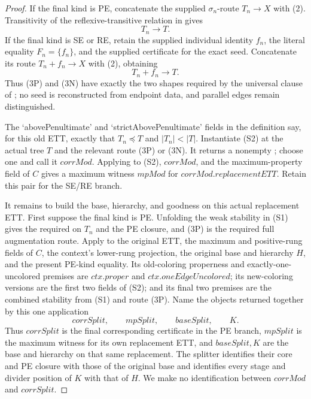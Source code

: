 \begin{proof}
If the final kind is PE, concatenate the supplied
\(\sigma_n\)-route \(T_n\longrightarrow X\) with (2).  Transitivity of the
reflexive-transitive relation in
 gives
\[
                         T_n\longrightarrow T.               \tag{3P}
\]
If the final kind is SE or RE, retain the supplied individual identity
\(f_n\), the literal equality \(F_n=\{f_n\}\), and the supplied
 certificate for the exact seed.  Concatenate
its route \(T_n+f_n\longrightarrow X\) with (2), obtaining
\[
                         T_n+f_n\longrightarrow T.           \tag{3N}
\]
Thus (3P) and (3N) have exactly the two shapes required by the universal
clause of ; no seed is reconstructed from endpoint
data, and parallel edges remain distinguished.

The `abovePenultimate' and `strictAbovePenultimate' fields in the
definition  say, for this old ETT, exactly
that \(T_n\preccurlyeq T\) and \(|T_n|<|T|\).
Instantiate (S2) at the actual tree \(T\) and
the relevant route (3P) or (3N).  It returns a nonempty
; choose one and call it
\(\mathit{corrMod}\).  Applying  to
(S2), \(\mathit{corrMod}\), and the maximum-property field of
 \(C\) gives a maximum witness
\(\mathit{mpMod}\) for
\(\mathit{corrMod}.\mathit{replacementETT}\).  Retain this pair for the
SE/RE branch.                                                        \(\tag{4}\)

It remains to build the base, hierarchy, and goodness on this actual
replacement ETT.  First suppose the final kind is PE.  Unfolding the
weak stability in (S1) gives the required
 on \(T_n\) and the PE closure, and (3P)
is the required full augmentation route.  Apply
 to the original ETT, the maximum and
positive-rung fields of \(C\), the context's lower-rung projection, the
original base and hierarchy \(H\), and the present PE-kind equality.
Its old-coloring properness and exactly-one-uncolored premises are
\(\mathit{ctx.proper}\) and \(\mathit{ctx.oneEdgeUncolored}\); its
new-coloring versions are the first two fields of (S2); and its final
two premises are the combined stability from (S1) and route (3P).  Name
the objects returned together by this one application
\[
 \mathit{corrSplit},\qquad \mathit{mpSplit},\qquad
 \mathit{baseSplit},\qquad K.                                      \tag{4a}
\]
Thus \(\mathit{corrSplit}\) is the final corresponding certificate in
the PE branch, \(\mathit{mpSplit}\) is the maximum witness for its own
replacement ETT, and \(\mathit{baseSplit},K\) are the base and hierarchy
on that same replacement.  The splitter identifies their core and PE
closure with those of the original base and identifies every stage and
divider position of \(K\) with that of \(H\).  We make no identification
between \(\mathit{corrMod}\) and \(\mathit{corrSplit}\).


\end{proof}

